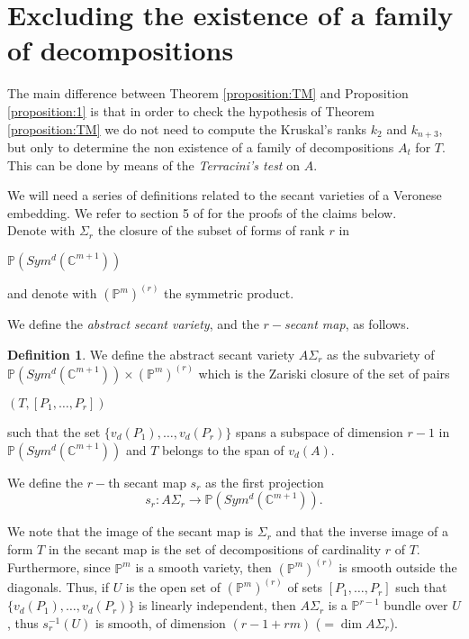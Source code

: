 \documentclass[a4paper,10pt,oneside]{article}
\theoremstyle{casep}
\newcommand{\C}{\mathbb{C}}
\newcommand{\Pj}{\mathbb{P}}
\theoremstyle{definition}
\newtheorem{definition}[theorem]{Definition}
\begin{document}
\section{Excluding the existence of a family of decompositions}
\label{Excluding the existence of a family of decompositions}
The main difference between Theorem \ref{proposition:TM} and Proposition \ref{proposition:1} is that in order to check the hypothesis of 
Theorem \ref{proposition:TM} we do not need to compute the Kruskal's ranks $k_2$ and $k_{n+3}$, but only to determine the non existence 
of a family of decompositions ${A_t}$ for $T$.
This can be done by means of the \emph{Terracini's test} on $A$.

We will need a series of definitions related to the secant varieties of a Veronese embedding.
We refer to section 5 of \cite{dodici} for the proofs of the claims below.\\
Denote with $\Sigma_r$ the closure of the subset of forms of rank $r$ in \begin{small}
$\Pj(Sym^d(\C^{m+1}))$
\end{small} 
and denote with $(\Pj^m)^{(r)}$ the symmetric product.
 
We define the \emph{abstract secant variety}, and the \emph{$r-$secant map}, as follows. 


\begin{definition} We define the abstract secant variety $A\Sigma_r$ as the subvariety of $\Pj(Sym^d(\C^{m+1})) \times (\Pj^m)^{(r)}$ which is the Zariski closure of the set of pairs \begin{small}$(T,[P_1, \dots, P_r ])$ \end{small} such that the set $\{v_d(P_1), \dots , v_d(P_r) \}$ spans a subspace of dimension $r - 1$ 
in $\Pj(Sym^d(\C^{m+1}))$ and $T$ belongs to the span of $v_d(A)$.

We define the $r-$th secant map $s_r$ as the first projection
$$ s_r : A \Sigma_r \rightarrow \Pj(Sym^d(\C^{m+1})).$$
\end{definition}

We note that the image of the secant map is $\Sigma_r$ and that the inverse image of a form $T$ in the secant map is the set of decompositions 
of cardinality $r$ of $T$.
Furthermore, since $\Pj^m$ is a smooth variety, then $(\Pj^m)^{(r)}$ is smooth outside the diagonals.
Thus, if $U$ is the open set of $(\Pj^m)^{(r)}$ of sets $[P_1,\dots, P_r]$ such that $\{v_d(P_1), \dots , v_d(P_r) \}$ is linearly independent,
then $A\Sigma_r$ is a $\Pj^{r-1}$ bundle over $U$, thus $s_r^{-1}(U)$ is smooth, of dimension $(r-1+rm)$ ($=\dim A\Sigma_r$).
\end{document}
